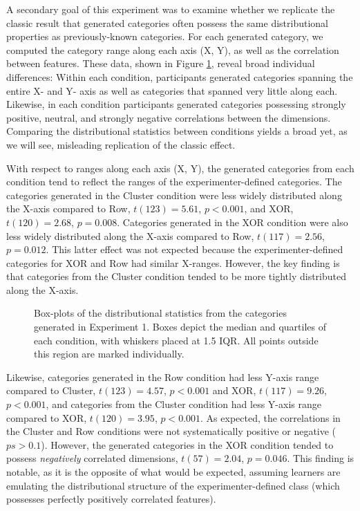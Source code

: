 \documentclass[12pt]{article}
\newcommand\inputpgf[2]{{
\let\pgfimageWithoutPath\pgfimage
\renewcommand{\pgfimage}[2][]{\pgfimageWithoutPath[##1]{#1/##2}}

}}
\begin{document}
\begin{flushleft}
A secondary goal of this experiment was to examine whether we replicate the classic result that generated categories often possess the same distributional properties as previously-known categories. For each generated category, we computed the category range along each axis (X, Y), as well as the correlation between features. These data, shown in Figure \ref{fig:e1-statsboxes}, reveal broad individual differences: Within each condition, participants generated categories spanning the entire X- and Y- axis as well as categories that spanned very little along each. Likewise, in each condition participants generated categories possessing strongly positive, neutral, and strongly negative correlations between the dimensions. Comparing the distributional statistics between conditions yields a broad yet, as we will see, misleading replication of the classic effect. 

With respect to ranges along each axis (X, Y), the generated categories from each condition tend to reflect the ranges of the experimenter-defined categories. The categories generated in the Cluster condition were less widely distributed along the X-axis compared to Row, $t(123) = 5.61$, $p < 0.001$, and XOR, $t(120) = 2.68$, $p = 0.008$. Categories generated in the XOR condition were also less widely distributed along the X-axis compared to Row, $t(117) = 2.56$, $p = 0.012$. This latter effect was not expected because the experimenter-defined categories for XOR and Row had similar X-ranges. However, the key finding is that categories from the Cluster condition tended to be more tightly distributed along the X-axis.

\begin{figure}
    \begin{center}
    \inputpgf{figs/}{e1-statsboxes.pgf}
    \caption{Box-plots of the distributional statistics from the categories generated in Experiment 1. Boxes depict the median and quartiles of each condition, with whiskers placed at 1.5 IQR. All points outside this region are marked individually.}
    \label{fig:e1-statsboxes}
    \end{center}
\end{figure}


Likewise, categories generated in the Row condition had less Y-axis range compared to Cluster, $t(123) = 4.57$, $p < 0.001$ and XOR, $t(117) = 9.26$, $p < 0.001$, and categories from the Cluster condition had less Y-axis range compared to XOR, $t(120) = 3.95$, $p < 0.001$. As expected, the correlations in the Cluster and Row conditions were not systematically positive or negative ($ps > 0.1$). However, the generated categories in the XOR condition tended to possess {\em negatively} correlated dimensions, $t(57) = 2.04$, $p = 0.046$. This finding is notable, as it is the opposite of what would be expected, assuming learners are emulating the distributional structure of the experimenter-defined class (which possesses perfectly positively correlated features). 


\end{flushleft}
\end{document}
